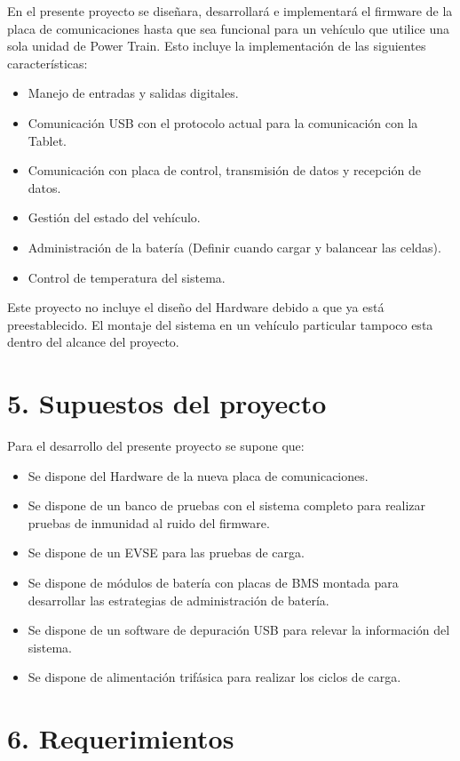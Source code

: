 \documentclass[
11pt, %
codirector, %
]{charter}
\begin{document}
En el presente proyecto se diseñara, desarrollará e implementará el firmware de la placa de comunicaciones hasta que sea funcional para un vehículo que utilice una sola unidad de Power Train.
Esto incluye la implementación de las siguientes características:
\begin{itemize}
	\item Manejo de entradas y salidas digitales.
	\item Comunicación USB con el protocolo actual para la comunicación con la Tablet.
	\item Comunicación con placa de control, transmisión de datos y recepción de datos.
	\item Gestión del estado del vehículo.
	\item Administración de la batería (Definir cuando cargar y balancear las celdas).
	\item Control de temperatura del sistema.
\end{itemize}

Este proyecto no incluye el diseño del Hardware debido a que ya está preestablecido. El montaje del sistema en un vehículo particular tampoco esta dentro del alcance del proyecto.


\section{5. Supuestos del proyecto}
\label{sec:supuestos}

	Para el desarrollo del presente proyecto se supone que:

	\begin{itemize}
		\item Se dispone del Hardware de la nueva placa de comunicaciones.
		\item Se dispone de un banco de pruebas con el sistema completo para realizar pruebas de inmunidad al ruido del firmware.
		\item Se dispone de un EVSE para las pruebas de carga.
		\item Se dispone de módulos de batería con placas de BMS montada para desarrollar las estrategias de administración de batería.
		\item Se dispone de un software de depuración USB para relevar la información del sistema.
		\item Se dispone de alimentación trifásica para realizar los ciclos de carga.
	\end{itemize}


\section{6. Requerimientos}
\label{sec:requerimientos}
\end{document}
